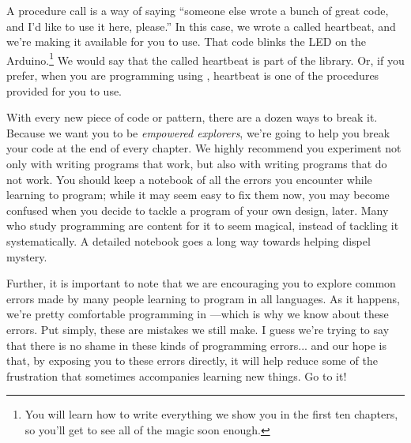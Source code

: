 A procedure call is a way of saying ``someone else wrote a bunch of great code, and I'd like to use it here, please.'' In this case, we wrote a \PROC called {\code heartbeat}, and we're making it available for you to use. That code blinks the LED on the Arduino.\footnote{You will learn how to write everything we show you in the first ten chapters, so you'll get to see all of the magic soon enough.} We would say that the \PROC called {\code heartbeat} is part of the \plumbing library. Or, if you prefer, when you are programming using \plumbing, {\code heartbeat} is one of the procedures provided for you to use.

\BREAKAGE
With every new piece of code or pattern, there are a dozen ways to break it. Because we want you to be {\em empowered explorers}, we're going to help you break your code at the end of every chapter. We highly recommend you experiment not only with writing programs that work, but also with writing programs that {\strong do not} work. You should keep a notebook of all the errors you encounter while learning to program; while it may seem easy to fix them now, you may become confused when you decide to tackle a program of your own design, later. Many who study programming are content for it to seem magical, instead of tackling it systematically. A detailed notebook goes a long way towards helping dispel mystery.

Further, it is important to note that we are encouraging you to explore common errors made by many people learning to program in all languages. As it happens, we're pretty comfortable programming in \occam---which is why we know about these errors. Put simply, {\strong these are mistakes we still make}. I guess we're trying to say that there is no shame in these kinds of programming errors... and our hope is that, by exposing you to these errors directly, it will help reduce some of the frustration that sometimes accompanies learning new things. Go to it!

\newpage

